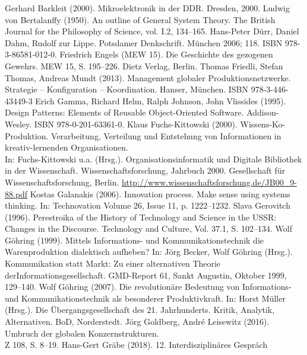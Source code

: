 \documentclass[11pt,a4paper]{article}
\begin{document}
\begin{thebibliography}{xxx}
 Gerhard Barkleit (2000). Mikroelektronik in der
  DDR. Dresden, 2000.
 Ludwig von Bertalanffy (1950). An outline of General
  System Theory. The British Journal for the Philosophy of Science, vol. I.2,
  134–165.
 Hans-Peter Dürr, Daniel Dahm, Rudolf zur Lippe. Potsdamer
  Denkschrift.  München 2006; 118. ISBN 978-3-86581-012-0.
 Friedrich Engels (MEW 15). Die Geschichte des gezogenen
  Gewehrs.  MEW 15, S. 195--226. Dietz Verlag, Berlin.
 Thomas Friedli, Stefan Thomas, Andreas Mundt (2013).
  Management globaler Produktionsnetzwerke. Strategie – Konfiguration –
  Koordination. Hanser, München. ISBN 978-3-446-43449-3
 Erich Gamma, Richard Helm, Ralph Johnson, John Vlissides
  (1995). Design Patterns: Elements of Reusable Object-Oriented Software.
  Addison-Wesley. ISBN 978-0-201-63361-0.
 Klaus Fuchs-Kittowski (2000).  Wissens-Ko-Produktion.
  Verarbeitung, Verteilung und Entstehung von Informationen in
  kreativ-lernenden Organisationen.\\ In: Fuchs-Kittowski u.a.
  (Hrsg.). Organisationsinformatik und Digitale Bibliothek in der
  Wissenschaft. Wissenschaftsforschung, Jahrbuch 2000. Gesellschaft für
  Wissenschaftsforschung, Berlin.
  \url{http://www.wissenschaftsforschung.de/JB00_9-88.pdf}
 Kostas Galanakis (2006).  Innovation process. Make
  sense using systems thinking.  In: Technovation Volume 26, Issue 11,
  p. 1222--1232.
 Slava Gerovitch (1996). Perestroika of the History of
  Technology and Science in the USSR: Changes in the Discourse. Technology and
  Culture, Vol. 37.1, S. 102--134.
 Wolf Göhring (1999).  Mittels Informations- und
  Kommunikationstechnik die Warenproduktion dialektisch aufheben? In: Jörg
  Becker, Wolf Göhring (Hrsg.).  Kommunikation statt Markt: Zu einer
  alternativen Theorie derInformationsgesellschaft.  GMD-Report 61, Sankt
  Augustin, Oktober 1999, 129–140.
 Wolf Göhring (2007). Die revolutionäre Bedeutung von
  Informations- und Kommunikationstechnik als besonderer Produktivkraft. In:
  Horst Müller (Hrsg.).  Die Übergangsgesellschaft des 21. Jahrhunderts.
  Kritik, Analytik, Alternativen.  BoD, Norderstedt.
 Jörg Goldberg, André Leisewitz (2016). Umbruch der
  globalen Konzernstrukturen.\\ Z 108, S. 8--19.
 Hans-Gert Gräbe (2018).  12. Interdisziplinäres Gespräch

\end{thebibliography}
\end{document}
